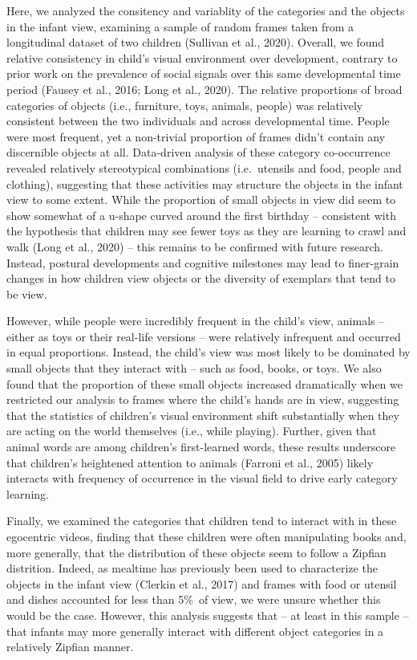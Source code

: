 \documentclass[10pt, letterpaper]{article}
\begin{document}
Here, we analyzed the consitency and variablity of the categories and
the objects in the infant view, examining a sample of random frames
taken from a longitudinal dataset of two children (Sullivan et al.,
2020). Overall, we found relative consistency in child's visual
environment over development, contrary to prior work on the prevalence
of social signals over this same developmental time period (Fausey et
al., 2016; Long et al., 2020). The relative proportions of broad
categories of objects (i.e., furniture, toys, animals, people) was
relatively consistent between the two individuals and across
developmental time. People were most frequent, yet a non-trivial
proportion of frames didn't contain any discernible objects at all.
Data-driven analysis of these category co-occurrence revealed relatively
stereotypical combinations (i.e.~utensils and food, people and
clothing), suggesting that these activities may structure the objects in
the infant view to some extent. While the proportion of small objects in
view did seem to show somewhat of a u-shape curved around the first
birthday -- consistent with the hypothesis that children may see fewer
toys as they are learning to crawl and walk (Long et al., 2020) -- this
remains to be confirmed with future research. Instead, postural
developments and cognitive milestones may lead to finer-grain changes in
how children view objects or the diversity of exemplars that tend to be
view.

However, while people were incredibly frequent in the child's view,
animals -- either as toys or their real-life versions -- were relatively
infrequent and occurred in equal proportions. Instead, the child's view
was most likely to be dominated by small objects that they interact with
-- such as food, books, or toys. We also found that the proportion of
these small objects increased dramatically when we restricted our
analysis to frames where the child's hands are in view, suggesting that
the statistics of children's visual environment shift substantially when
they are acting on the world themselves (i.e., while playing). Further,
given that animal words are among children's first-learned words, these
results underscore that children's heightened attention to animals
(Farroni et al., 2005) likely interacts with frequency of occurrence in
the visual field to drive early category learning.

Finally, we examined the categories that children tend to interact with
in these egocentric videos, finding that these children were often
manipulating books and, more generally, that the distribution of these
objects seem to follow a Zipfian distrition. Indeed, as mealtime has
previously been used to characterize the objects in the infant view
(Clerkin et al., 2017) and frames with food or utensil and dishes
accounted for less than 5\%~of view, we were unsure whether this would
be the case. However, this analysis suggests that -- at least in this
sample -- that infants may more generally interact with different object
categories in a relatively Zipfian manner.
\end{document}
